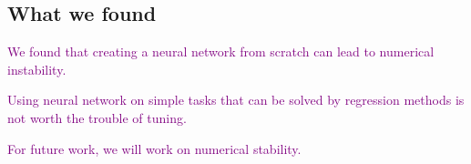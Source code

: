 \subsection{What we found}

\textcolor{purple}{We found that creating a neural network from scratch can lead to numerical instability. }

\textcolor{purple}{Using neural network on simple tasks that can be solved by regression methods is not worth the trouble of tuning.}

\textcolor{purple}{For future work, we will work on numerical stability. }
